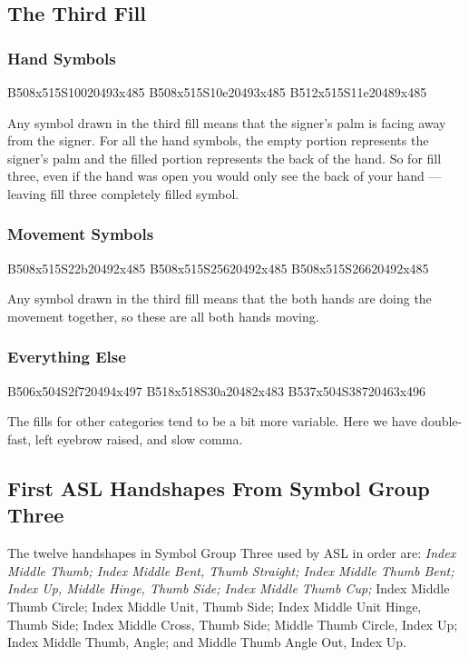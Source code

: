 \documentclass{article}
\begin{document}
\subsection{The Third Fill}

\subsubsection{Hand Symbols}

\begin{center}
B508x515S10020493x485 B508x515S10e20493x485 B512x515S11e20489x485
\end{center}

Any symbol drawn in the third fill means that the signer's palm is facing away from the signer.
For all the hand symbols, the empty portion represents the signer's palm and the filled portion represents the back of the hand.
So for fill three, even if the hand was open you would only see the back of your hand --- leaving fill three completely filled symbol.

\subsubsection{Movement Symbols}

\begin{center}
B508x515S22b20492x485 B508x515S25620492x485 B508x515S26620492x485
\end{center}

Any symbol drawn in the third fill means that the both hands are doing the movement together, so these are all both hands moving.

\subsubsection{Everything Else}

\begin{center}
B506x504S2f720494x497 B518x518S30a20482x483 B537x504S38720463x496
\end{center}

The fills for other categories tend to be a bit more variable.
Here we have double-fast, left eyebrow raised, and slow comma.

\subsection{First ASL Handshapes From Symbol Group Three}

The twelve handshapes in Symbol Group Three used by ASL in order are:
{\it
Index Middle Thumb;
Index Middle Bent, Thumb Straight;
Index Middle Thumb Bent;
Index Up, Middle Hinge, Thumb Side;
Index Middle Thumb Cup;
}
Index Middle Thumb Circle;
Index Middle Unit, Thumb Side;
Index Middle Unit Hinge, Thumb Side;
Index Middle Cross, Thumb Side;
Middle Thumb Circle, Index Up;
Index Middle Thumb, Angle;
and Middle Thumb Angle Out, Index Up.
\end{document}
